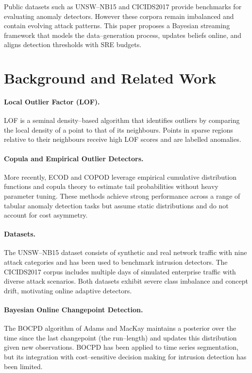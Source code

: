 \documentclass{article}
\begin{document}
Public datasets such as UNSW--NB15 and CICIDS2017 provide benchmarks for evaluating anomaly detectors\cite{moustafa2015unsw,sharafaldin2018cicids}.  However these corpora remain imbalanced and contain evolving attack patterns.  This paper proposes a Bayesian streaming framework that models the data--generation process, updates beliefs online, and aligns detection thresholds with SRE budgets.

\section{Background and Related Work}
\paragraph{Local Outlier Factor (LOF).}  LOF\cite{breunig2000lof} is a seminal density--based algorithm that identifies outliers by comparing the local density of a point to that of its neighbours.  Points in sparse regions relative to their neighbours receive high LOF scores and are labelled anomalies.

\paragraph{Copula and Empirical Outlier Detectors.}  More recently, ECOD\cite{li2022ecod} and COPOD\cite{li2020copod} leverage empirical cumulative distribution functions and copula theory to estimate tail probabilities without heavy parameter tuning.  These methods achieve strong performance across a range of tabular anomaly detection tasks but assume static distributions and do not account for cost asymmetry.

\paragraph{Datasets.}  The UNSW--NB15 dataset\cite{moustafa2015unsw,moustafa2016unswEval} consists of synthetic and real network traffic with nine attack categories and has been used to benchmark intrusion detectors.  The CICIDS2017 corpus\cite{sharafaldin2018cicids} includes multiple days of simulated enterprise traffic with diverse attack scenarios.  Both datasets exhibit severe class imbalance and concept drift, motivating online adaptive detectors.

\paragraph{Bayesian Online Changepoint Detection.}  The BOCPD algorithm of Adams and MacKay\cite{adams2007bocpd} maintains a posterior over the time since the last changepoint (the run--length) and updates this distribution given new observations.  BOCPD has been applied to time series segmentation, but its integration with cost--sensitive decision making for intrusion detection has been limited.
\end{document}
